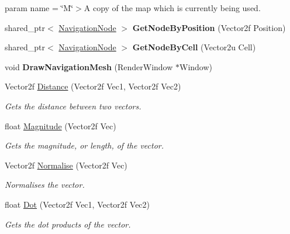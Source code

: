 \begin{DoxyCompactItemize}
\begin{DoxyCompactList}
param name = \char`\"{}\+M\char`\"{}$>$A copy of the map which is currently being used.\end{DoxyCompactList}\item 
\mbox{\label{namespace_engine_1_1_core_a4eaf009494fa2585558ca3304f50e5e3}} 
shared\+\_\+ptr$<$ \hyperlink{struct_engine_1_1_core_1_1_navigation_node}{Navigation\+Node} $>$ {\bfseries Get\+Node\+By\+Position} (Vector2f Position)
\item 
\mbox{\label{namespace_engine_1_1_core_a7119d03c8c96615994192f46e9aebf06}} 
shared\+\_\+ptr$<$ \hyperlink{struct_engine_1_1_core_1_1_navigation_node}{Navigation\+Node} $>$ {\bfseries Get\+Node\+By\+Cell} (Vector2u Cell)
\item 
\mbox{\label{namespace_engine_1_1_core_afa102a2c2f09440acd93027cdc866245}} 
void {\bfseries Draw\+Navigation\+Mesh} (Render\+Window $\ast$Window)
\item 
Vector2f \hyperlink{namespace_engine_1_1_core_a168a564b1bf2d0949b409aa78ed292f2}{Distance} (Vector2f Vec1, Vector2f Vec2)
\begin{DoxyCompactList}\small\item\em Gets the distance between two vectors. \end{DoxyCompactList}\item 
float \hyperlink{namespace_engine_1_1_core_a81febf5a36b0440b0e1cf7b3116113ec}{Magnitude} (Vector2f Vec)
\begin{DoxyCompactList}\small\item\em Gets the magnitude, or length, of the vector. \end{DoxyCompactList}\item 
Vector2f \hyperlink{namespace_engine_1_1_core_a816eef2f0a1a1ae9bfb3b520eeb73677}{Normalise} (Vector2f Vec)
\begin{DoxyCompactList}\small\item\em Normalises the vector. \end{DoxyCompactList}\item 
float \hyperlink{namespace_engine_1_1_core_a72cfe6298618c9023d217b9ab03664ee}{Dot} (Vector2f Vec1, Vector2f Vec2)
\begin{DoxyCompactList}\small\item\em Gets the dot products of the vector. \end{DoxyCompactList}\item 

\end{DoxyCompactItemize}
